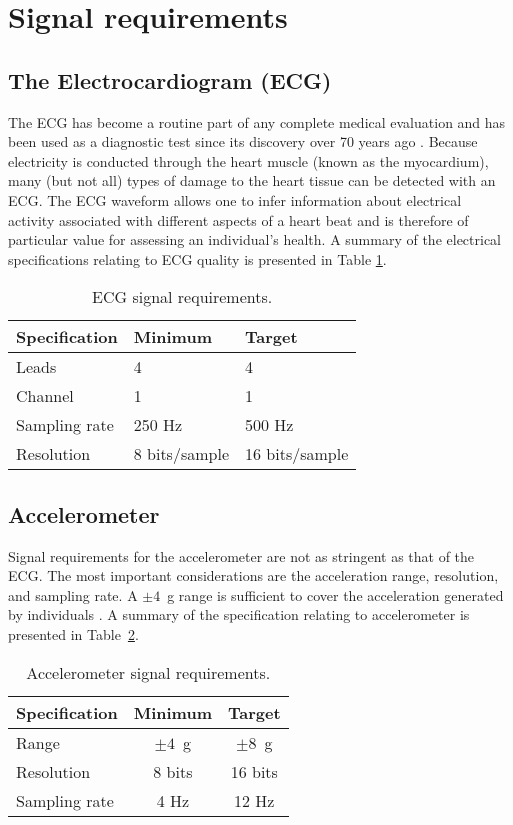 \section{Signal requirements}\label{signal requirements}
\subsection{The Electrocardiogram (ECG)}

The ECG has become a routine part of any complete medical evaluation
and has been used as a diagnostic test since its discovery over 70
years ago \cite{ecg}. Because electricity is conducted through the
heart muscle (known as the myocardium), many (but not all) types of
damage to the heart tissue can be detected with an ECG. The ECG
waveform allows one to infer information about electrical activity
associated with different aspects of a heart beat and is therefore of
particular value for assessing an individual's health. A summary of
the electrical specifications relating to ECG quality is presented in
Table \ref{table:ecg}.

\begin{table}
  \caption{ECG signal requirements.}
  \label{table:ecg}
  \centering
  \begin{tabular}{|l|l|l|}
    \hline
    Specification & Minimum & Target \\
    \hline
    Leads & 4 & 4 \\
    Channel & 1 & 1 \\
    Sampling rate & 250 Hz & 500 Hz \\
    Resolution & 8 bits/sample & 16 bits/sample \\
    \hline
  \end{tabular}
\end{table}

\subsection{Accelerometer}

Signal requirements for the accelerometer are not as stringent as
that of the ECG. The most important considerations are the
acceleration range, resolution, and sampling rate. A $\pm 4$~g range is
sufficient to cover the acceleration generated by individuals
\cite{wearable_ecg}. A summary of the specification relating to
accelerometer is presented in Table~\ref{table:acc}.

\begin{table}
	\caption{Accelerometer signal requirements.}
	\label{table:acc}
	\centering
	\begin{tabular}{|l |c|c|}
		\hline
		Specification & Minimum & Target \\
		\hline
		Range & $\pm 4$~g & $\pm 8$~g \\
		Resolution & 8 bits & 16 bits\\
		Sampling rate & 4 Hz & 12 Hz \\
		\hline
	\end{tabular}
\end{table}

